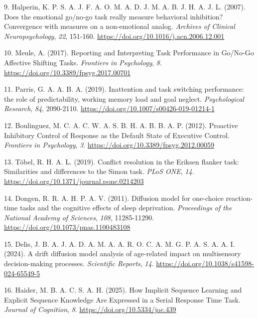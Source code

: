 \documentclass[
  spanish,
  10pt,
]{article}
\newlength{\cslhangindent}
\newenvironment{CSLReferences}[2] %
 {\begin{list}{}{%
  \setlength{\itemindent}{0pt}
  \setlength{\leftmargin}{0pt}
  \setlength{\parsep}{0pt}
  \ifodd #1
   \setlength{\leftmargin}{\cslhangindent}
   \setlength{\itemindent}{-1\cslhangindent}
  \fi
  \setlength{\itemsep}{#2\baselineskip}}}
 {\end{list}}
\begin{document}
\begin{CSLReferences}{1}{0}
9. Halperin, K. P. S. A. J. F. A. O. M. A. D. J. M. A. B. J. H. A. J. L.
(2007). Does the emotional go/no-go task really measure behavioral
inhibition?Convergence with measures on a non-emotional analog.
\emph{Archives of Clinical Neuropsychology}, \emph{22}, 151-160.
\url{https://doi.org/10.1016/j.acn.2006.12.001}

10. Meule, A. (2017). Reporting and Interpreting Task Performance in
Go/No-Go Affective Shifting Tasks. \emph{Frontiers in Psychology},
\emph{8}. \url{https://doi.org/10.3389/fpsyg.2017.00701}

11. Parris, G. A. A. B. A. (2019). Inattention and task switching
performance: the role of predictability, working memory load and goal
neglect. \emph{Psychological Research}, \emph{84}, 2090-2110.
\url{https://doi.org/10.1007/s00426-019-01214-1}

12. Boulinguez, M. C. A. C. W. A. S. B. H. A. B. B. A. P. (2012).
Proactive Inhibitory Control of Response as the Default State of
Executive Control. \emph{Frontiers in Psychology}, \emph{3}.
\url{https://doi.org/10.3389/fpsyg.2012.00059}

13. Töbel, R. H. A. L. (2019). Conflict resolution in the Eriksen
flanker task: Similarities and differences to the Simon task. \emph{PLoS
ONE}, \emph{14}. \url{https://doi.org/10.1371/journal.pone.0214203}

14. Dongen, R. R. A. H. P. A. V. (2011). Diffusion model for one-choice
reaction-time tasks and the cognitive effects of sleep deprivation.
\emph{Proceedings of the National Academy of Sciences}, \emph{108},
11285-11290. \url{https://doi.org/10.1073/pnas.1100483108}

15. Delis, J. B. A. J. A. D. A. M. A. A. R. O. C. A. M. G. P. A. S. A.
A. I. (2024). A drift diffusion model analysis of age-related impact on
multisensory decision-making processes. \emph{Scientific Reports},
\emph{14}. \url{https://doi.org/10.1038/s41598-024-65549-5}

16. Haider, M. B. A. C. S. A. H. (2025). How Implicit Sequence Learning
and Explicit Sequence Knowledge Are Expressed in a Serial Response Time
Task. \emph{Journal of Cognition}, \emph{8}.
\url{https://doi.org/10.5334/joc.439}


\end{CSLReferences}
\end{document}

